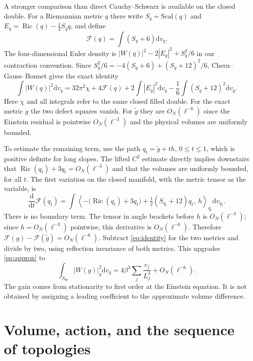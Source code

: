 \documentclass[11pt]{article}
\theoremstyle{remark}
\newcommand{\Ric}{\operatorname{Ric}}
\newcommand{\dd}{\mathrm d}
\begin{document}
A stronger comparison than direct Cauchy--Schwarz is available on the closed double. For a Riemannian metric \(q\) there write \(S_q=\mathrm{Scal}(q)\) and \(E_q=\Ric(q)-\tfrac14 S_q q\), and define
\[
 \mathcal F(q)=\int (S_q+6)\dd v_q.
\]
The four-dimensional Euler density is \(|W(q)|^2-2|E_q|^2+S_q^2/6\) in our contraction convention. Since \(S_q^2/6=-4(S_q+6)+(S_q+12)^2/6\), Chern--Gauss--Bonnet gives the exact identity
\begin{equation}\label{eq:identity}
 \int |W(q)|^2\dd v_q
 =32\pi^2\chi+4\mathcal F(q)+2\int |E_q|^2\dd v_q
           -\frac16\int (S_q+12)^2\dd v_q.
\end{equation}
Here \(\chi\) and all integrals refer to the same closed filled double. For the exact metric \(g\) the two defect squares vanish. For \(\widetilde g\) they are \(O_N(\ell^{-6})\) since the Einstein residual is pointwise \(O_N(\ell^{-3})\) and the physical volumes are uniformly bounded.

To estimate the remaining term, use the path \(q_t=\widetilde g+t h\), \(0\le t\le1\), which is positive definite for long slopes. The lifted \(C^2\) estimate directly implies downstairs that \(\Ric(q_t)+3q_t=O_N(\ell^{-3})\) and that the volumes are uniformly bounded, for all \(t\). The first variation on the closed manifold, with the metric tensor as the variable, is
\[
 \frac{\dd}{\dd t}\mathcal F(q_t)
 =\int \left\langle -\big(\Ric(q_t)+3q_t\big)
                   +\tfrac12(S_{q_t}+12)q_t,\ h\right\rangle_{q_t}
          \dd v_{q_t}.
\]
There is no boundary term. The tensor in angle brackets before \(h\) is \(O_N(\ell^{-3})\); since \(h=O_N(\ell^{-3})\) pointwise, this derivative is \(O_N(\ell^{-6})\). Therefore \(\mathcal F(g)-\mathcal F(\widetilde g)=O_N(\ell^{-6})\). Subtract \eqref{eq:identity} for the two metrics and divide by two, using reflection invariance of both metrics. This upgrades \eqref{eq:approx} to
\begin{equation}\label{eq:exact}
 \int_{N_{\boldsymbol\sigma}} |W(g)|_{g}^2\dd v_g
   =4\beta^3\sum_j\frac{v_j}{L_j^3}+O_N(\ell^{-6}).
\end{equation}
The gain comes from stationarity to first order at the Einstein equation. It is not obtained by assigning a leading coefficient to the approximate volume difference.

\section{Volume, action, and the sequence of topologies}\label{sec:action}
\end{document}
